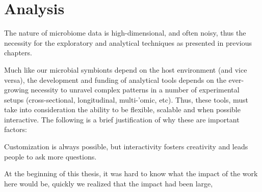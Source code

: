 \section{Analysis}

The nature of microbiome data is high-dimensional, and often noisy, thus the
necessity for the exploratory and analytical techniques as presented in
previous chapters.

Much like our microbial symbionts depend on the host environment (and vice
versa), the development and funding of analytical tools depends on the
ever-growing necessity to unravel complex patterns in a number of experimental
setups (cross-sectional, longitudinal, multi-'omic, etc). Thus, these tools,
must take into consideration the ability to be flexible, scalable and when
possible interactive. The following is a brief justification of why these are
important factors:

Customization is always possible, but interactivity fosters creativity and
leads people to ask more questions.

At the beginning of this thesis, it was hard to know what the impact of the
work here would be, quickly we realized that the impact had been large,

